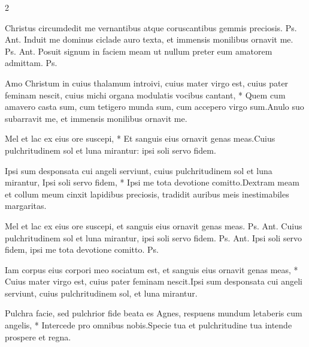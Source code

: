 \begin{multicols*}{2}
\begin{responsory-doxology}
\end{responsory-doxology}%
 Christus circumdedit me vernantibus atque coruscantibus gemmis preciosis. {\color{Red} Ps.}  {\color{Red} Ant.} Induit me dominus ciclade auro texta, et immensis monilibus ornavit me. {\color{Red} Ps.}  {\color{Red} Ant.} Posuit signum in faciem meam ut nullum preter eum amatorem admittam. {\color{Red} Ps.} 
\begin{responsory}
{Amo Christum in cuius thalamum introivi, cuius mater virgo est, cuius pater feminam nescit, cuius michi organa modulatis vocibus cantant, * Quem cum amavero casta sum, cum tetigero munda sum, cum accepero virgo sum.}{Anulo suo subarravit me, et immensis monilibus ornavit me.}
\end{responsory}%
\begin{responsory}
{Mel et lac ex eius ore suscepi, * Et sanguis eius ornavit genas meas.}{Cuius pulchritudinem sol et luna mirantur: ipsi soli servo fidem.}
\end{responsory}%
\begin{responsory-doxology}
{Ipsi sum desponsata cui angeli serviunt, cuius pulchritudinem sol et luna mirantur, Ipsi soli servo fidem, * Ipsi me tota devotione comitto.}{Dextram meam et collum meum cinxit lapidibus preciosis, tradidit auribus meis inestimabiles margaritas.}
\end{responsory-doxology}%
 Mel et lac ex eius ore suscepi, et sanguis eius ornavit genas meas. {\color{Red} Ps.}  {\color{Red} Ant.} Cuius pulchritudinem sol et luna mirantur, ipsi soli servo fidem. {\color{Red} Ps.}  {\color{Red} Ant.} Ipsi soli servo fidem, ipsi me tota devotione comitto. {\color{Red} Ps.} 
\begin{responsory}
{Iam corpus eius corpori meo sociatum est, et sanguis eius ornavit genas meas, * Cuius mater virgo est, cuius pater feminam nescit.}{Ipsi sum desponsata cui angeli serviunt, cuius pulchritudinem sol, et luna mirantur.}
\end{responsory}%
\begin{responsory}
{Pulchra facie, sed pulchrior fide beata es Agnes, respuens mundum letaberis cum angelis, * Intercede pro omnibus nobis.}{Specie tua et pulchritudine tua intende prospere et regna.}%

\end{responsory}
\end{multicols*}
